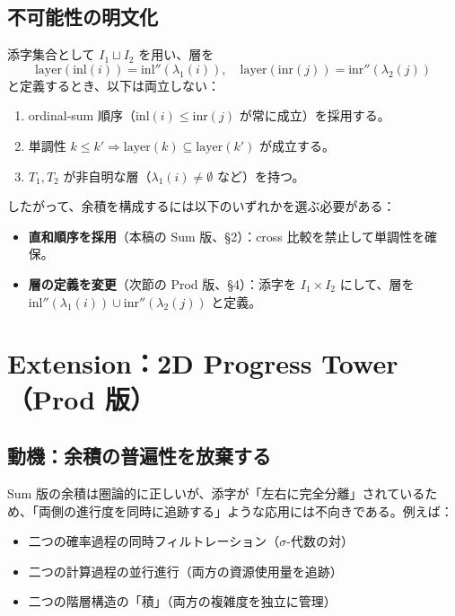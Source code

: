 \documentclass[a4paper,12pt]{ltjsarticle}
\theoremstyle{definition}
\begin{document}
\subsection{不可能性の明文化}

\begin{tcolorbox}[title=定理（非形式的）]
添字集合として $I_1 \sqcup I_2$ を用い、層を
\[
\text{layer}(\mathrm{inl}(i)) = \mathrm{inl}''(\lambda_1(i)), \quad
\text{layer}(\mathrm{inr}(j)) = \mathrm{inr}''(\lambda_2(j))
\]
と定義するとき、以下は両立しない：
\begin{enumerate}
    \item ordinal-sum 順序（$\mathrm{inl}(i) \leq \mathrm{inr}(j)$ が常に成立）を採用する。
    \item 単調性 $k \leq k' \Rightarrow \text{layer}(k) \subseteq \text{layer}(k')$ が成立する。
    \item $T_1, T_2$ が非自明な層（$\lambda_1(i) \neq \emptyset$ など）を持つ。
\end{enumerate}
\end{tcolorbox}

したがって、余積を構成するには以下のいずれかを選ぶ必要がある：
\begin{itemize}
    \item \textbf{直和順序を採用}（本稿の Sum 版、\S2）：cross 比較を禁止して単調性を確保。
    \item \textbf{層の定義を変更}（次節の Prod 版、\S4）：添字を $I_1 \times I_2$ にして、層を $\mathrm{inl}''(\lambda_1(i)) \cup \mathrm{inr}''(\lambda_2(j))$ と定義。
\end{itemize}

\section{Extension：2D Progress Tower（Prod 版）}

\subsection{動機：余積の普遍性を放棄する}

Sum 版の余積は圏論的に正しいが、添字が「左右に完全分離」されているため、「両側の進行度を同時に追跡する」ような応用には不向きである。例えば：
\begin{itemize}
    \item 二つの確率過程の同時フィルトレーション（$\sigma$-代数の対）
    \item 二つの計算過程の並行進行（両方の資源使用量を追跡）
    \item 二つの階層構造の「積」（両方の複雑度を独立に管理）
\end{itemize}
\end{document}
